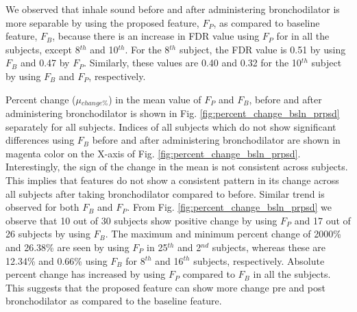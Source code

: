 \documentclass{article}
\begin{document}
We observed that inhale sound before and after administering bronchodilator is more separable by using the proposed feature, $F_{P}$, as compared to baseline feature, $F_{B}$, because there is an increase in FDR value using $F_P$ for in all the subjects, except 8$^{th}$ and  10$^{th}$. For the 8$^{th}$ subject, the FDR value is 0.51 by using $F_{B}$ and 0.47 by $F_{P}$. Similarly, these values are 0.40 and 0.32 for the 10$^{th}$ subject by using $F_{B}$ and $F_{P}$, respectively.


Percent change ($\mu{_{change\%}}$) in the mean value of $F_{P}$ and $F_{B}$, before and after administering bronchodilator is shown in Fig. \ref{fig:percent_change_bsln_prpsd} separately for all subjects. Indices of all subjects which do not show significant differences using $F_{B}$ before and after administering bronchodilator are shown in magenta color on the X-axis of Fig. \ref{fig:percent_change_bsln_prpsd}. Interestingly, the sign of the change in the mean is not consistent across subjects. This implies that features do not show a consistent pattern in its change across all subjects after taking bronchodilator compared to before. Similar trend is observed for both $F_B$ and $F_P$. From Fig. \ref{fig:percent_change_bsln_prpsd} we observe that 10 out of 30 subjects show positive change by using $F_{P}$ and 17 out of 26 subjects by using $F_{B}$. The maximum and minimum percent change of 2000\% and 26.38\% are seen by using $F_{P}$ in 25$^{th}$ and 2$^{nd}$ subjects, whereas these are 12.34\% and 0.66\% using $F_{B}$ for 8$^{th}$ and 16$^{th}$ subjects, respectively. Absolute percent change has increased by using $F_{P}$ compared to $F_{B}$ in all the subjects. This suggests that the proposed feature can show more change pre and post bronchodilator as compared to the baseline feature.




\end{document}
